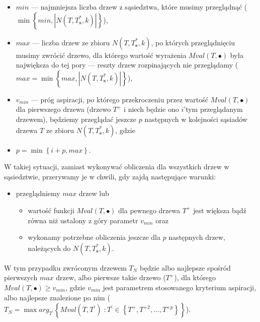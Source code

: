 \begin{itemize}
	\item $min$ --- najmniejsza liczba drzew z sąsiedztwa, które musimy przeglądnąć ($\min \left\{ min, \left| N \left( T, T^{\ast}_{\textbf{s}}, k \right) \right| \right\}$),
	\item $max$ --- liczba drzew ze zbioru $N \left( T, T^{\ast}_{\textbf{s}}, k \right)$, po których przeglądnięciu musimy zwrócić drzewo, dla którego wartość wyrażenia $Mval \left( T, \bullet \right)$ była największa do tej pory --- reszty drzew rozpinających nie przeglądamy ($max = \min \left\{ max, \left| N \left( T, T^{\ast}_{\textbf{s}}, k \right) \right| \right\}$),
	\item $v_{min}$ --- próg aspiracji, po którego przekroczeniu przez wartość $Mval \left( T, \bullet \right)$ dla pierwszego drzewa (drzewo $T^{+}$ i niech będzie ono $i$'tym przeglądanym drzewem), będziemy przeglądać jeszcze $p$ następnych w kolejności sąsiadów drzewa $T$ ze zbioru $N \left( T, T^{\ast}_{\textbf{s}}, k \right)$, gdzie
	\item $p = \min \left\{ i + p, max \right\}$.
\end{itemize}

W takiej sytuacji, zamiast wykonywać obliczenia dla wszystkich drzew w sąsiedztwie, przerywamy je w chwili, gdy zajdą następujące warunki:

\begin{itemize}
	\item przeglądniemy $max$ drzew lub
	\begin{itemize}
		\item wartość funkcji $Mval \left( T, \bullet \right)$ dla pewnego drzewa $T^{+}$ jest większa bądź równa niż ustalony z góry parametr $v_{min}$ oraz
		\item wykonamy potrzebne obliczenia jeszcze dla $p$ następnych drzew, należących do $N \left( T, T^{\ast}_{\textbf{s}}, k \right)$.
	\end{itemize}
\end{itemize}

W tym przypadku zwróconym drzewem $T_{N}$ będzie albo najlepsze spośród pierwszych $max$ drzew, albo pierwsze takie drzewo ($T^{+}$), dla którego $Mval \left( T, \bullet \right) \geqslant v_{min}$, gdzie $v_{min}$ jest parametrem stosowanego kryterium aspiracji, albo najlepsze znalezione po nim ($T_{N} = \max arg_{T^{\prime}} \left\{ Mval \left( T, T^{\prime} \right) \; : T^{\prime} \in \left\{ T^{+}, T^{+2}, \dots, T^{+p} \right\} \right\}$).

